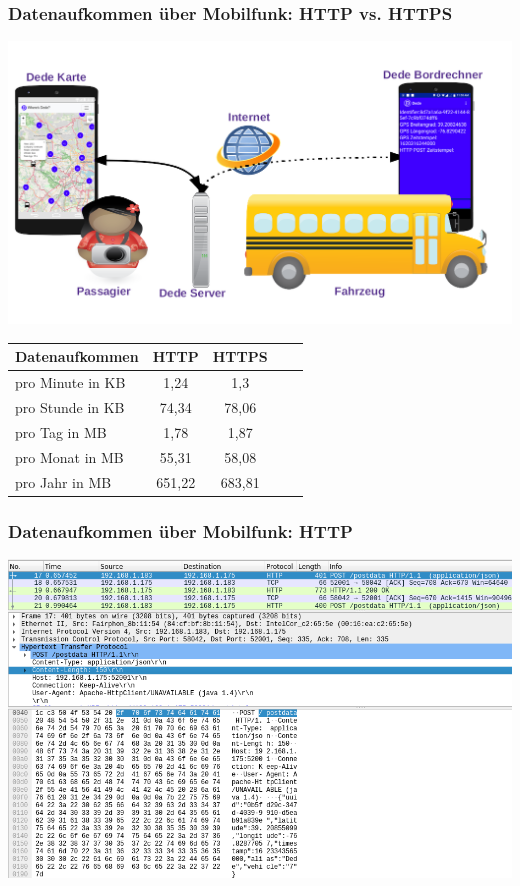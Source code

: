 \begin{frame}
  \frametitle{Datenaufkommen über Mobilfunk: HTTP vs. HTTPS}
  \includegraphics[width=0.7\paperwidth]{dede/dede-concept}
  \begin{tabular}{lcccc}
    Datenaufkommen   & HTTP  & HTTPS \\\hline
    pro Minute in KB & 1,24  & 1,3   \pause\\
    pro Stunde in KB & 74,34 & 78,06 \pause\\
    pro Tag in MB    & 1,78  & 1,87 \pause\\
    pro Monat in MB  & 55,31 & 58,08 \pause\\
    pro Jahr in MB   & 651,22& 683,81
  \end{tabular}
\end{frame}

\begin{frame}
  \frametitle{Datenaufkommen über Mobilfunk: HTTP}
  \includegraphics[width=0.88\paperwidth]{dede/dede-obc-wireshark-http-post}
\end{frame}

